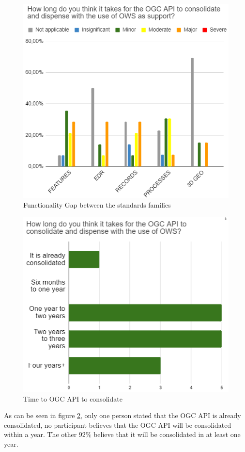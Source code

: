 \begin{figure}[H]
     \centering
     \includegraphics[scale=0.84]{img/gap.png}
     \caption{
     Functionality Gap between the standards families}
     \label{fig:gap}
\end{figure}



\begin{figure}[H]
     \centering
     \includegraphics[scale=0.7]{img/consolidate.png}
     \caption{Time to OGC API to consolidate}
     \label{fig:consolidate}
\end{figure}

As can be seen in figure \ref{fig:consolidate}, only one person stated that the OGC API is already consolidated, no participant believes that the OGC API will be consolidated within a year. The other 92\% believe that it will be consolidated in at least one year.
